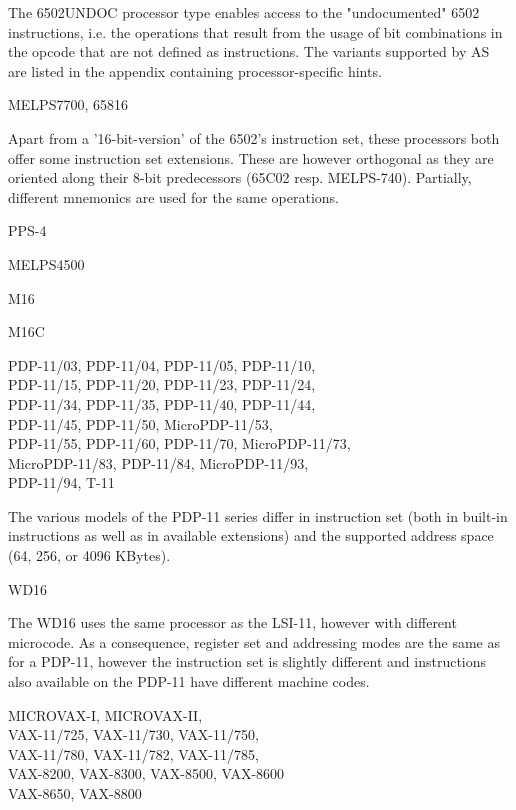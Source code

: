 \documentclass[12pt,twoside]{report}
\newcommand{\asname}{{AS}}
\begin{document}
The 6502UNDOC processor type enables access to the "undocumented"
6502 instructions, i.e. the operations that result from the usage of bit
combinations in the opcode that are not defined as instructions.  The
variants supported by \asname{} are listed in the appendix containing processor-specific
hints.
\begin{cpulist}
   MELPS7700, 65816
\end{cpulist}
Apart from a '16-bit-version' of the 6502's instruction set, these
processors both offer some instruction set extensions.  These are
however orthogonal as they are oriented along their 8-bit
predecessors (65C02 resp. MELPS-740).  Partially, different
mnemonics are used for the same operations.
\begin{cpulist}
   PPS-4
\end{cpulist}
\begin{cpulist}
   MELPS4500
\end{cpulist}
\begin{cpulist}
   M16
\end{cpulist}
\begin{cpulist}
   M16C
\end{cpulist}
\begin{cpulist}
   PDP-11/03, PDP-11/04, PDP-11/05, PDP-11/10,\\
\> PDP-11/15, PDP-11/20, PDP-11/23, PDP-11/24,\\
\> PDP-11/34, PDP-11/35, PDP-11/40, PDP-11/44,\\
\> PDP-11/45, PDP-11/50, MicroPDP-11/53,\\
\> PDP-11/55, PDP-11/60, PDP-11/70, MicroPDP-11/73,\\
\> MicroPDP-11/83, PDP-11/84, MicroPDP-11/93,\\
\> PDP-11/94, T-11
\end{cpulist}
The various models of the PDP-11 series differ in instruction
set (both in built-in instructions as well as in available extensions)
and the supported address space (64, 256, or 4096 KBytes).
\begin{cpulist}
   WD16
\end{cpulist}
The WD16 uses the same processor as the LSI-11, however
with different microcode.  As a consequence, register set
and addressing modes are the same as for a PDP-11, however
the instruction set is slightly different and instructions
also available on the PDP-11 have different machine codes.
\begin{cpulist}
   MICROVAX-I, MICROVAX-II, \\
\> VAX-11/725, VAX-11/730, VAX-11/750, \\
\> VAX-11/780, VAX-11/782, VAX-11/785, \\
\> VAX-8200, VAX-8300, VAX-8500, VAX-8600 \\
\> VAX-8650, VAX-8800
\end{cpulist}
\end{document}
